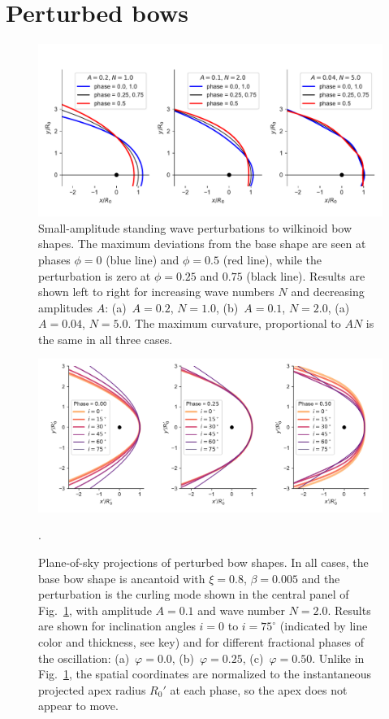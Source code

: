 \section{Perturbed bows}
\label{sec:perturbed-bows}

\begin{figure}
  \centering
  \includegraphics[width=\linewidth]{figs/compare_xyprime_wave-wilkinoid}
  \caption{Small-amplitude standing wave perturbations to wilkinoid
    bow shapes.  The maximum deviations from the base shape are seen
    at phases \(\phi = 0\) (blue line) and \(\phi = 0.5\) (red line), while
    the perturbation is zero at \(\phi = 0.25\) and \(0.75\) (black
    line).  Results are shown left to right for increasing wave
    numbers \(N\) and decreasing amplitudes \(A\): (a)~\(A = 0.2\),
    \(N = 1.0\), (b)~\(A = 0.1\), \(N = 2.0\), (a)~\(A = 0.04\),
    \(N = 5.0\).  The maximum curvature, proportional to \(A N\) is
    the same in all three cases.}
  \label{fig:perturb-shapes}
\end{figure}
\begin{figure}
  \centering
  \includegraphics[width=\linewidth]
  {figs/wave_xyprime-A010-N20-ancantoid-xi080-beta000500}
  \caption{Plane-of-sky projections of perturbed bow shapes.  In all
    cases, the base bow shape is ancantoid with \(\xi = 0.8\),
    \(\beta = 0.005\) and the perturbation is the curling mode shown in
    the central panel of Fig.~\ref{fig:perturb-shapes}, with amplitude
    \(A = 0.1\) and wave number \(N = 2.0\). Results are shown for
    inclination angles \(i = 0\) to \(i = 75^\circ\) (indicated by line
    color and thickness, see key) and for different fractional phases
    of the oscillation: (a)~\(\varphi = 0.0\), (b)~\(\varphi = 0.25\),
    (c)~\(\varphi = 0.50\). Unlike in Fig.~\ref{fig:perturb-shapes}, the
    spatial coordinates are normalized to the instantaneous projected
    apex radius \(R_0'\) at each phase, so the apex does not appear to
    move.}.
  \label{fig:perturb-xy-prime}
\end{figure}

